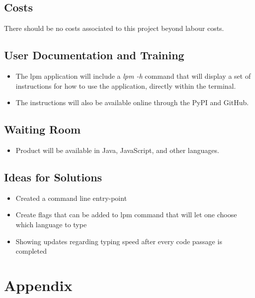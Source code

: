 \documentclass[12pt, titlepage]{article}
\begin{document}
\subsection{Costs}
There should be no costs associated to this project beyond labour costs.

\subsection{User Documentation and Training}
\begin{itemize}
    \item The lpm application will include a \textit{lpm -h} command that will display a set of instructions for how to use the application, directly within the terminal.
    \item The instructions will also be available online through the PyPI and GitHub.
\end{itemize}

\subsection{Waiting Room}
\begin{itemize}
    \item Product will be available in Java, JavaScript, and other languages.
\end{itemize}

\subsection{Ideas for Solutions}
\begin{itemize}
    \item Created a command line entry-point
    \item Create flags that can be added to lpm command that will let one choose which language to type
    \item Showing updates regarding typing speed after every code passage is completed
\end{itemize}






\newpage

\section{Appendix}
\end{document}
